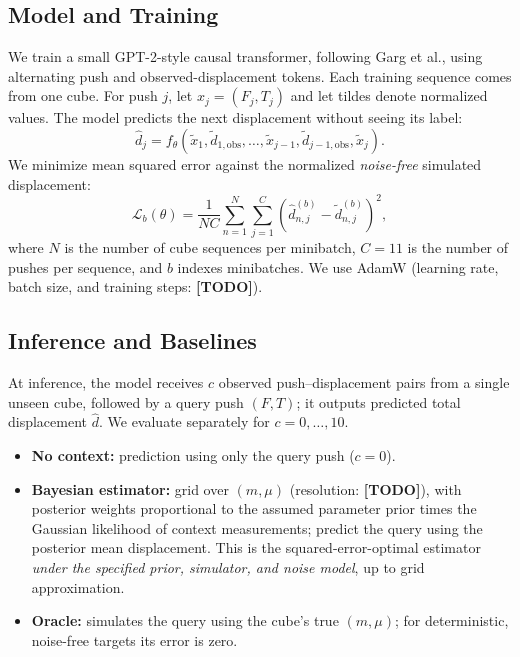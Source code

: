 \documentclass[12pt]{article}
\begin{document}
\subsection{Model and Training}
We train a small GPT-2-style causal transformer, following Garg et al., using alternating push and observed-displacement tokens. Each training sequence comes from one cube. For push $j$, let $x_j=(F_j,T_j)$ and let tildes denote normalized values. The model predicts the next displacement without seeing its label:
\begin{equation}
\hat d_j=f_\theta(\tilde x_1,\tilde d_{1,\mathrm{obs}},\ldots,\tilde x_{j-1},\tilde d_{j-1,\mathrm{obs}},\tilde x_j).
\end{equation}
We minimize mean squared error against the normalized \emph{noise-free} simulated displacement:
\begin{equation}
\mathcal L_b(\theta)=\frac{1}{NC}\sum_{n=1}^{N}\sum_{j=1}^{C}\left(\hat d_{n,j}^{(b)}-\tilde d_{n,j}^{(b)}\right)^2,
\end{equation}
where $N$ is the number of cube sequences per minibatch, $C=11$ is the number of pushes per sequence, and $b$ indexes minibatches. We use AdamW (learning rate, batch size, and training steps: \textbf{[TODO]}).

\subsection{Inference and Baselines}
At inference, the model receives $c$ observed push--displacement pairs from a single unseen cube, followed by a query push $(F,T)$; it outputs predicted total displacement $\hat d$. We evaluate separately for $c=0,\ldots,10$.
\begin{itemize}
    \item \textbf{No context:} prediction using only the query push ($c=0$).
    \item \textbf{Bayesian estimator:} grid over $(m,\mu)$ (resolution: \textbf{[TODO]}), with posterior weights proportional to the assumed parameter prior times the Gaussian likelihood of context measurements; predict the query using the posterior mean displacement. This is the squared-error-optimal estimator \emph{under the specified prior, simulator, and noise model}, up to grid approximation.
    \item \textbf{Oracle:} simulates the query using the cube's true $(m,\mu)$; for deterministic, noise-free targets its error is zero.
\end{itemize}
\end{document}
